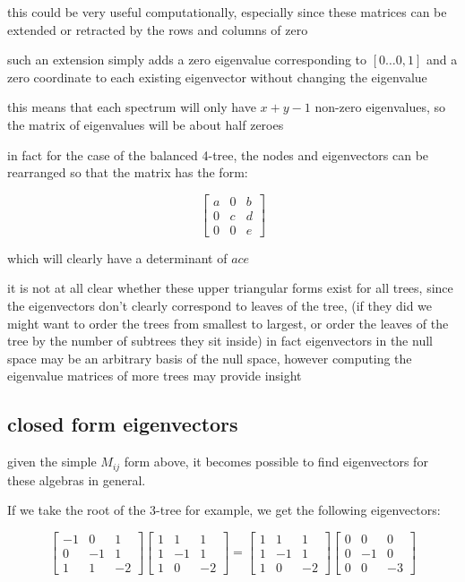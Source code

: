 \documentclass{report}
\begin{document}
this could be very useful computationally, especially since these matrices can
be extended or retracted by the rows and columns of zero

such an extension simply adds a zero eigenvalue corresponding to
$[0\ldots 0, 1]$
and a zero coordinate to each existing eigenvector without changing the
eigenvalue

this means that each spectrum will only have $x + y - 1$ non-zero eigenvalues,
so the matrix of eigenvalues will be about half zeroes

in fact for the case of the balanced 4-tree, the nodes and eigenvectors can be
rearranged so that the matrix has the form:

\begin{equation*}
\left[ \begin{matrix}
a & 0 & b\\
0 & c & d\\
0 & 0 & e
\end{matrix} \right]
\end{equation*}

which will clearly have a determinant of $ace$

it is not at all clear whether these upper triangular forms exist for all
trees, since the eigenvectors don't clearly correspond to leaves of the tree,
(if they did we might want to order the trees from smallest to largest, or
order the leaves of the tree by the number of subtrees they sit inside)
in fact eigenvectors in the null space may be an arbitrary basis of the null
space, however computing the eigenvalue matrices of more trees may provide
insight



\subsection{closed form eigenvectors}

given the simple $M_{ij}$ form above, it becomes possible to find eigenvectors for
these algebras in general.

If we take the root of the 3-tree for example, we get the following
eigenvectors:

\begin{equation*}
\left[\begin{matrix}
	-1 & 0 & 1\\
	0 & -1 & 1\\
	1 & 1 & -2
\end{matrix}\right]
\left[\begin{matrix}
	1 & 1 & 1\\
	1 & -1 & 1\\
	1 & 0 & -2
\end{matrix}\right]
=
\left[\begin{matrix}
	1 & 1 & 1\\
	1 & -1 & 1\\
	1 & 0 & -2
\end{matrix}\right]
\left[\begin{matrix}
	0 & 0 & 0\\
	0 & -1 & 0\\
	0 & 0 & -3
\end{matrix}\right]
\end{equation*}
\end{document}
